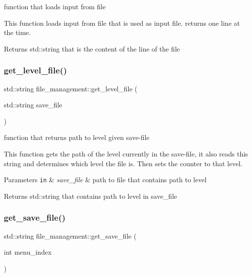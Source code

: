 function that loads input from file 

This function loads input from file that is used as input file. returns one line at the time.

\begin{DoxyReturn}{Returns}
std\+::string that is the content of the line of the file 
\end{DoxyReturn}
\mbox{\label{classfile__management_a58233800263bf74ae074a9a46f4a7bd0}} 
\subsubsection{\texorpdfstring{get\+\_\+level\+\_\+file()}{get\_level\_file()}}
{\footnotesize\ttfamily std\+::string file\+\_\+management\+::get\+\_\+level\+\_\+file (\begin{DoxyParamCaption}\item[{std\+::string}]{save\+\_\+file }\end{DoxyParamCaption})}



function that returns path to level given save-\/file 

This function gets the path of the level currently in the save-\/file, it also reads this string and determines which level the file is. Then sets the counter to that level.


\begin{DoxyParams}[1]{Parameters}
\mbox{\tt in}  & {\em save\+\_\+file} & path to file that contains path to level\\
\hline
\end{DoxyParams}
\begin{DoxyReturn}{Returns}
std\+::string that contains path to level in save\+\_\+file 
\end{DoxyReturn}
\mbox{\label{classfile__management_a92ece2d05964c828dcb9bf6c59043327}} 
\subsubsection{\texorpdfstring{get\+\_\+save\+\_\+file()}{get\_save\_file()}}
{\footnotesize\ttfamily std\+::string file\+\_\+management\+::get\+\_\+save\+\_\+file (\begin{DoxyParamCaption}\item[{int}]{menu\+\_\+index }\end{DoxyParamCaption})}




